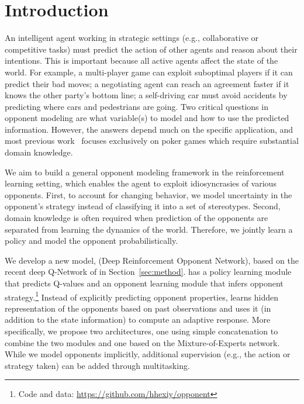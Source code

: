 \section{Introduction}
\label{sec:intro}

An intelligent agent working in strategic settings (e.g., collaborative or
competitive tasks) must predict the action of other agents and reason about
their intentions.  This is important because all active agents affect the state
of the world.  For example, a multi-player game  can exploit suboptimal
players if it can predict their bad moves; a negotiating agent can reach an
agreement faster if it knows the other party's bottom line; a self-driving car
must avoid accidents by predicting where cars and pedestrians are going.  Two
critical questions in opponent modeling are what variable(s) to model and how to
use the predicted information.  However, the answers depend much on the specific
application, and most previous
work~\cite{opponent-modeling-in-poker,bayesbluff,game-theory-opponent-modeling}
focuses exclusively on poker games which require substantial domain knowledge.

We aim to build a general opponent modeling framework in the
reinforcement learning setting, which enables the agent to exploit
idiosyncrasies of various opponents.  First, to account for
changing behavior, we model uncertainty in the opponent's
strategy instead of classifying it into a set of stereotypes.
Second, domain knowledge is often required when prediction of the
opponents are separated from learning the dynamics of the world.
Therefore, we jointly learn a policy and model the opponent
probabilistically.

We develop a new model, \dron{} (Deep
Reinforcement Opponent Network), based on the recent deep
Q-Network of \citet[\dqn{}]{mnih-dqn-2015} in Section~\ref{sec:method}.
\dron{} has a policy learning module that predicts Q-values
and an opponent learning module that infers opponent strategy.\footnote{Code and data: \url{https://github.com/hhexiy/opponent}}
Instead of explicitly predicting
opponent properties, \dron{} learns hidden representation of the opponents
based on past observations and uses it (in addition to the state information) to compute an adaptive response.
More specifically,
we propose two architectures, one using simple concatenation to combine the two modules and one based on the Mixture-of-Experts network.
While we model opponents implicitly,
additional supervision (e.g., the action or strategy taken)
can be added through multitasking.

